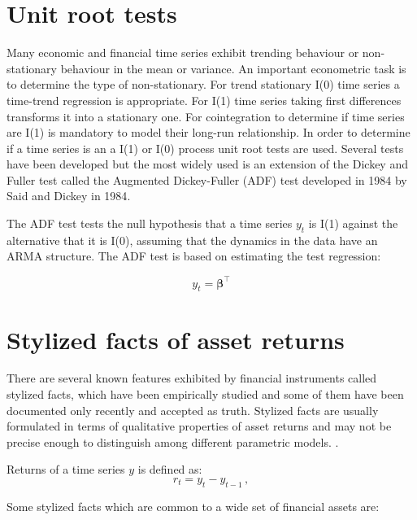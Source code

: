 \section{Unit root tests}

Many economic and financial time series exhibit trending behaviour or non-stationary behaviour in the mean or variance. An important econometric task is to determine the type of non-stationary. For trend stationary I(0) time series a time-trend regression is appropriate. For I(1) time series taking first differences transforms it into a stationary one.  For cointegration to determine if time series are I(1) is mandatory to model their long-run relationship. In order to determine if a time series is an a I(1) or I(0) process unit root tests are used. Several tests have been developed but the most widely used is an extension of the Dickey and Fuller test \cite{dickey1979} called the Augmented Dickey-Fuller (ADF) test developed in 1984 by Said and Dickey in 1984\cite{said1984}.

The ADF test tests the null hypothesis that a time series $y_t$ is I(1) against the alternative that it is I(0), assuming that the dynamics in the data have an ARMA structure. The ADF test is based on estimating the test regression:

\[
y_t = \boldsymbol{\beta}^\top
\]


\section{Stylized facts of asset returns}
\label{sec:stylizedfacts}

There are several known features exhibited by financial instruments called
stylized facts, which have been empirically studied and some of them have been
documented only recently and accepted as truth. Stylized facts are usually
formulated in terms of qualitative properties of asset returns and may not be
precise enough to distinguish among different parametric models.
\cite{cont2001}.

Returns of a time series $y$ is defined as:
\begin{equation}
\label{eq:returndef}
r_t = y_t - y_{t-1}  \, ,
\end{equation}

Some stylized facts which are common to a wide set of financial assets
\cite{sewell2011} are:

